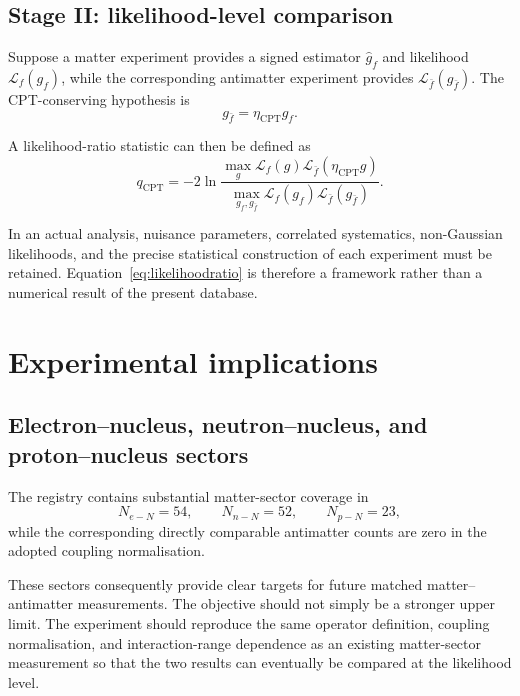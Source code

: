 \documentclass[aps,prd,reprint,superscriptaddress,nofootinbib]{revtex4-2}
\newcommand{\CPT}{\mathrm{CPT}}
\begin{document}
	\subsection{Stage II: likelihood-level comparison}
	
	Suppose a matter experiment provides a signed estimator $\hat g_f$ and
	likelihood $\mathcal L_f(g_f)$, while the corresponding antimatter
	experiment provides $\mathcal L_{\bar f}(g_{\bar f})$. The
	CPT-conserving hypothesis is
	\begin{equation}
		g_{\bar f}=\eta_\CPT g_f.
	\end{equation}
	
	A likelihood-ratio statistic can then be defined as
	\begin{equation}
		q_\CPT
		=
		-2\ln
		\frac{
			\displaystyle
			\max_g
			\mathcal L_f(g)
			\mathcal L_{\bar f}(\eta_\CPT g)
		}{
			\displaystyle
			\max_{g_f,g_{\bar f}}
			\mathcal L_f(g_f)
			\mathcal L_{\bar f}(g_{\bar f})
		}.
		\label{eq:likelihoodratio}
	\end{equation}
	
	In an actual analysis, nuisance parameters, correlated systematics,
	non-Gaussian likelihoods, and the precise statistical construction of
	each experiment must be retained. Equation~\eqref{eq:likelihoodratio}
	is therefore a framework rather than a numerical result of the present
	database.
	
	\section{Experimental implications}
	
	\subsection{Electron--nucleus, neutron--nucleus, and proton--nucleus
		sectors}
	
	The registry contains substantial matter-sector coverage in
	\begin{equation}
		N_{e-N}=54,
		\qquad
		N_{n-N}=52,
		\qquad
		N_{p-N}=23,
	\end{equation}
	while the corresponding directly comparable antimatter counts are
	zero in the adopted coupling normalisation.
	
	These sectors consequently provide clear targets for future matched
	matter--antimatter measurements. The objective should not simply be a
	stronger upper limit. The experiment should reproduce the same
	operator definition, coupling normalisation, and interaction-range
	dependence as an existing matter-sector measurement so that the two
	results can eventually be compared at the likelihood level.
	
\end{document}
